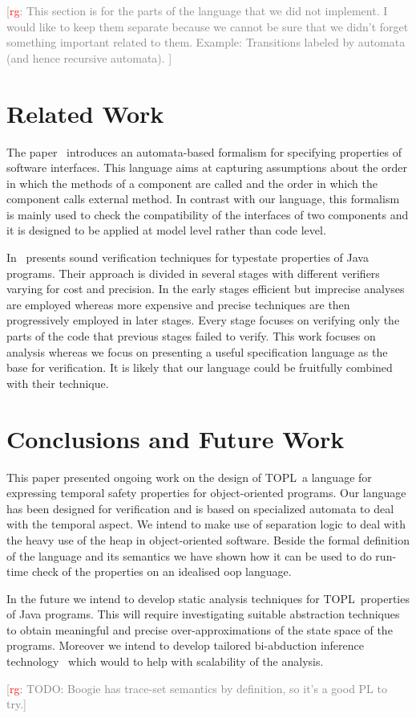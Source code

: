 \documentclass[preprint]{sigplanconf} %
\newcommand{\dinocomment}[1]{
\begin{center}
\fbox{
\begin{minipage}{3.0in}
{\bf Dino's comment:} {\it #1}
\end{minipage}}
\end{center}}
\newcommand{\note}[2]{\textcolor{gray}{[\textcolor{red}{#1}: #2]}}
\newcommand{\rg}[1]{\note{rg}{#1}}
\newcommand{\TPL}{TOPL}
\theoremstyle{definition}
\theoremstyle{remark}
\begin{document}
\rg{This section is for the parts of the language that we did not implement.
I would like to keep them separate because we cannot be sure that we didn't forget something important related to them.
Example: Transitions labeled by automata (and hence recursive automata).
}

\section{Related Work}\label{sec:related} %
The paper~\cite{DBLP:conf/sigsoft/AlfaroH01} introduces an automata-based formalism for specifying properties of software interfaces. 
This language aims at capturing assumptions about the order in which the methods of a component are called and the order in which the component calls external method. 
In contrast with our language, this formalism is mainly used to check the compatibility of the interfaces of two components and it is designed to be applied at  model level rather than code level.

In~\cite{DBLP:conf/issta/FinkYDRG06} presents sound verification techniques for typestate properties of Java  programs.
Their approach is divided in several stages with different verifiers varying for cost and precision.
In the early stages efficient but imprecise analyses are employed whereas 
more expensive and precise techniques are then progressively employed in later stages.
Every stage focuses on verifying only the parts of the code that previous stages failed to verify.
This work focuses on analysis whereas we focus on presenting a useful specification language as the base for verification.
It is likely that our language could be fruitfully combined with their technique.
\dinocomment{this is very weak! Need to be improved} 

\section{Conclusions and Future Work}\label{sec:conclusions} %
This paper presented ongoing work on the design of  \TPL \ a language for expressing temporal safety properties for object-oriented programs.
Our language has been designed for verification and is based on specialized automata to deal with the temporal aspect.
We intend to make use of  separation logic to deal with the  heavy use of the heap in object-oriented software. 
Beside the formal definition of the language and its semantics we have shown how it can be used to do run-time check of the properties 
on an idealised oop language.

In the future we intend to develop static analysis techniques for \TPL \ properties of Java programs.
This will require investigating suitable abstraction techniques to obtain meaningful and precise over-approximations
of the state space of the programs. Moreover we intend to develop tailored bi-abduction inference technology~\cite{DBLP:conf/popl/CalcagnoDOY09} which would to help with scalability of the analysis.

\rg{TODO: Boogie has trace-set semantics by definition, so it's a good PL to try.}


\softraggedright


\end{document}

